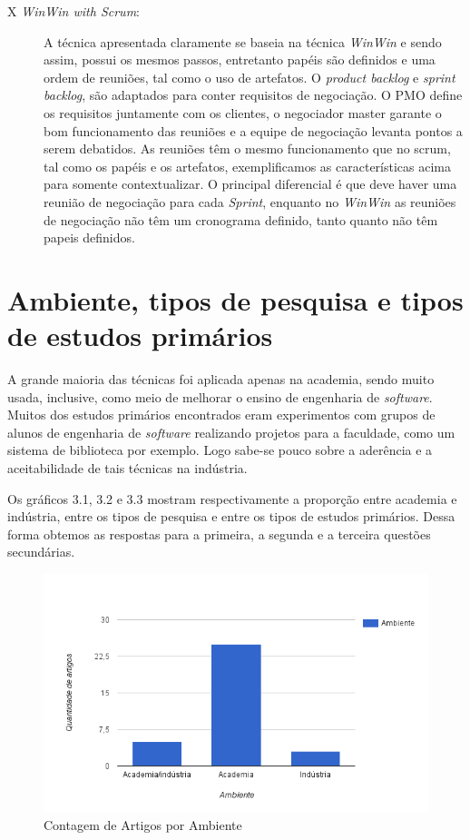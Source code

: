 \begin{description}
\item [X \textit{WinWin with Scrum}:]

A técnica apresentada claramente se baseia na técnica \textit{WinWin} e sendo
assim, possui os mesmos passos, entretanto papéis são definidos e uma ordem de reuniões, tal como o uso de artefatos.
O \textit{product backlog} e \textit{sprint backlog}, são adaptados para conter
requisitos de negociação.
O PMO define os requisitos juntamente com os clientes, o negociador master
garante o bom funcionamento das reuniões e a equipe de negociação levanta pontos a serem debatidos.
As reuniões têm o mesmo funcionamento que no scrum, tal como os papéis e os
artefatos, exemplificamos as características acima para somente contextualizar.
O principal diferencial é que deve haver uma reunião de negociação para cada
\textit{Sprint}, enquanto no \textit{WinWin} as reuniões de negociação não têm
um cronograma definido, tanto quanto não têm papeis definidos.
 \end{description}
 
 \section{Ambiente, tipos de pesquisa e tipos de estudos primários}

A grande maioria das técnicas foi aplicada apenas na academia, sendo
muito usada, inclusive, como meio de melhorar o ensino de engenharia de
\textit{software}. Muitos dos estudos primários encontrados eram experimentos
com grupos de alunos de engenharia de \textit{software} realizando projetos para
a faculdade, como um sistema de biblioteca por exemplo. Logo sabe-se pouco sobre a aderência e
a aceitabilidade de tais técnicas na indústria.

Os gráficos 3.1, 3.2 e 3.3 mostram respectivamente a proporção entre academia e
indústria, entre os tipos de pesquisa e entre os tipos de estudos primários.
Dessa forma obtemos as respostas para a primeira, a segunda e a terceira
questões secundárias.
 
 \begin{figure}[h!]
 \centering
 \includegraphics[scale=0.5]{tipo_de_ambiente.png}
 \caption{\label{fig:ambiente}Contagem de Artigos por Ambiente}
\end{figure}
 
